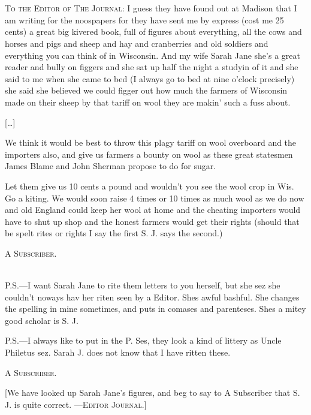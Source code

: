 \begin{ipquote}
\begin{center}
\\
\\
\end{center}
{\textsc{To the Editor of The Journal}: I guess they have found out at Madison that I am writing for the noospapers for they have sent me by express (cost me 25 cents) a great big kivered book, full of figures about everything, all the cows and horses and pigs and sheep and hay and cranberries and old soldiers and everything you can think of in Wisconsin. And my wife Sarah Jane she’s a great reader and bully on figgers and she sat up half the night a studyin of it and she said to me when she came to bed (I always go to bed at nine o’clock precisely) she said she believed we could figger out how much the farmers of Wisconsin made on their sheep by that tariff on wool they are makin’ such a fuss about.

\centering
{[…]}

We think it would be best to throw this plagy tariff on wool overboard and the importers also, and give us farmers a bounty on wool as these great statesmen James Blame and John Sherman propose to do for sugar.} {Let them give us 10 cents a pound and wouldn’t you see the wool crop in Wis. Go a kiting. We would soon raise 4 times or 10 times as much wool as we do now and old England could keep her wool at home and the cheating importers would have to shut up shop and the honest farmers would get their rights (should that be spelt rites or rights I say the first S. J. says the second.)

\raggedleft
\textsc{A Subscriber.}

}\\
P.S.—I want Sarah Jane to rite them letters to you herself, but she sez she couldn’t noways hav her riten seen by a Editor. Shes awful bashful. She changes the spelling in mine sometimes, and puts in comases and parenteses. Shes a mitey good scholar is S. J.\\
{P.S.—I always like to put in the P. Ses, they look a kind of littery as Uncle Philetus sez. Sarah J. do{\kern0pt}es not know that I have ritten these.

\raggedleft
\textsc{A Subscriber.}

{[We have looked up Sarah Jane’s figures, and beg to say to A Subscriber that S. J. is quite correct. —\textsc{Editor Journal}.]}}
\end{ipquote}

